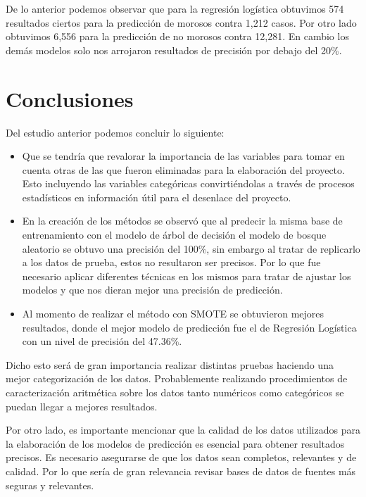 \documentclass[a4paper,12pt]{article}
\begin{document}
De lo anterior podemos observar que para la regresión logística obtuvimos 574 resultados ciertos para la predicción de morosos contra 1,212 casos. Por otro lado obtuvimos 6,556 para la predicción de no morosos contra 12,281. En cambio los demás modelos solo nos arrojaron resultados de precisión por debajo del 20\%.

\section{Conclusiones}

Del estudio anterior podemos concluir lo siguiente:

\begin{itemize}
    \item Que se tendría que revalorar la importancia de las variables para tomar en cuenta otras de las que fueron eliminadas para la elaboración del proyecto. Esto incluyendo las variables categóricas convirtiéndolas a través de procesos estadísticos en información útil para el desenlace del proyecto.
    \item En la creación de los métodos se observó que al predecir la misma base de entrenamiento con el modelo de árbol de decisión el modelo de bosque aleatorio se obtuvo una precisión del 100\%, sin embargo al tratar de replicarlo a los datos de prueba, estos no resultaron ser precisos. Por lo que fue necesario aplicar diferentes técnicas en los mismos para tratar de ajustar los modelos y que nos dieran mejor una precisión de predicción.
    \item Al momento de realizar el método con SMOTE se obtuvieron mejores resultados, donde el mejor modelo de predicción fue el de Regresión Logística con un nivel de precisión del 47.36\%. 
\end{itemize}

Dicho esto será de gran importancia realizar distintas pruebas haciendo una mejor categorización de los datos. Probablemente realizando procedimientos de caracterización aritmética sobre los datos tanto numéricos como categóricos se puedan llegar a mejores resultados. 

Por otro lado, es importante mencionar que la calidad de los datos utilizados para la elaboración de los modelos de predicción es esencial para obtener resultados precisos. Es necesario asegurarse de que los datos sean completos, relevantes y de calidad. Por lo que sería de gran relevancia revisar bases de datos de fuentes más seguras y relevantes.
\end{document}
